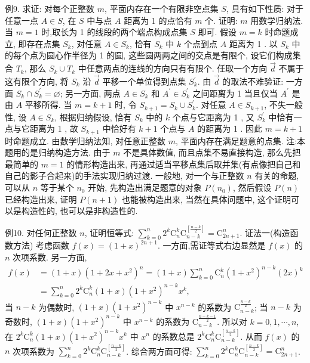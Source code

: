 例9. 求证: 对每个正整数 $m$, 平面内存在一个有限非空点集 $S$, 具有如下性质: 对于任意一点 $A \in S$, 在 $S$ 中与点 $A$ 距离为 1 的点恰有 $m$ 个.
证明: $m$ 用数学归纳法.
当 $m=1$ 时,取长为 1 的线段的两个端点构成点集 $S$ 即可.
假设 $m=k$ 时命题成立, 即存在点集 $S_k$, 对任意 $A \in S_k$, 恰有 $S_k$ 中 $k$ 个点到点 $A$ 距离为 1 .
以 $S_k$ 中的每个点为圆心作半径为 1 的圆, 这些圆两两之间的交点是有限个, 设它们构成集合 $T_k$, 那么 $S_k \cup T_k$ 中任意两点的连线的方向只有有限个.
任取一个方向 $\vec{d}$ 不属于这有限个方向, 将 $S_k$ 沿 $\vec{d}$ 平移一个单位得到点集 $S_k^{\prime}$.
由 $\vec{d}$ 的取法不难验证: 一方面 $S_k \cap S_k^{\prime}=\varnothing$; 另一方面, 两点 $A \in S_k$ 和 $A^{\prime} \in S_k^{\prime}$ 之间距离为 1 当且仅当 $A^{\prime}$ 是由 $A$ 平移所得.
当 $m=k+1$ 时, 令 $S_{k+1}=S_k \cup S_k^{\prime}$. 对任意 $A \in S_{k+1}$, 不失一般性, 设 $A \in S_k$, 根据归纳假设, 恰有 $S_k$ 中的 $k$ 个点与它距离为 1 , 又 $S_k^{\prime}$ 中恰有一点与它距离为 1 , 故 $S_{k+1}$ 中恰好有 $k+1$ 个点与 $A$ 的距离为 1 . 因此 $m=k+1$ 时命题成立.
由数学归纳法知, 对任意正整数 $m$, 平面内存在满足题意的点集.
注:本题用的是归纳构造方法.
由于 $m$ 不是具体数值, 而且点集不易直接构造, 那么先把最简单的 $m=1$ 的情形构造出来, 再通过适当平移点集后取并集(有点像把自己和自己的影子合起来)的手法实现归纳过渡.
一般地, 对一个与正整数 $n$ 有关的命题, 可以从 $n$ 等于某个 $n_0$ 开始, 先构造出满足题意的对象 $P\left(n_0\right)$, 然后假设 $P(n)$ 已经构造出来, 证明 $P(n+1)$ 也能被构造出来, 当然在具体问题中, 这个证明可以是构造性的, 也可以是非构造性的.



例10. 对任何正整数 $n$, 证明恒等式: $\sum_{k=0}^n 2^k \mathrm{C}_n^k \mathrm{C}_{n-k}^{\left[\frac{n-k}{2}\right]}=\mathrm{C}_{2 n+1}^n$. 
证法一(构造函数方法)
考虑函数 $f(x)=(1+x)^{2 n+1}$. 一方面,需证等式右边显然是 $f(x)$ 的 $n$ 次项系数.
另一方面,
$$
\begin{aligned}
f(x) & =(1+x)\left(1+2 x+x^2\right)^n=(1+x) \sum_{k=0}^n \mathrm{C}_n^k\left(1+x^2\right)^{n-k}(2 x)^k \\
& =\sum_{k=0}^n 2^k \mathrm{C}_n^k(1+x)\left(1+x^2\right)^{n-k} x^k,
\end{aligned}
$$
当 $n-k$ 为偶数时, $(1+x)\left(1+x^2\right)^{n-k}$ 中 $x^{n-k}$ 的系数为 $\mathrm{C}_{n-k}^{\frac{n-k}{2}}$;
当 $n-k$ 为奇数时, $(1+x)\left(1+x^2\right)^{n-k}$ 中 $x^{n-k}$ 的系数为 $\mathrm{C}_{n-k}^{\frac{n-k-1}{2}}$.
所以对 $k=0,1, \cdots, n$, 在 $2^k \mathrm{C}_n^k(1+x)\left(1+x^2\right)^{n-k} x^k$ 中 $x^n$ 的系数总是 $2^k \mathrm{C}_n^k \mathrm{C}_{n-k}^{\left[\frac{n-k}{2}\right]}$.
从而 $f(x)$ 的 $n$ 次项系数为 $\sum_{k=0}^n 2^k \mathrm{C}_n^k \mathrm{C}_{n-k}^{\left[\frac{n-k}{2}\right]}$.
综合两方面可得: $\sum_{k=0}^n 2^k \mathrm{C}_n^k \mathrm{C}_{n-k}^{\left[\frac{n-k}{2}\right]}=\mathrm{C}_{2 n+1}^n$.



